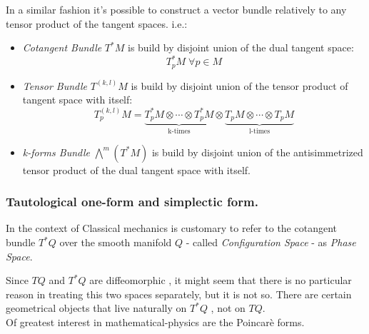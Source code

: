 \documentclass[Main]{subfiles}
\begin{document}
			\begin{observation}
				In a similar fashion it's possible to construct a vector bundle relatively to any tensor product of the tangent spaces.
				i.e.:
				\begin{itemize}
					\item \emph{Cotangent Bundle} $T^*M$ is build by disjoint union of the dual tangent space: 
					$$T_p^*M \; \forall p\in M$$
					\item \emph{Tensor Bundle} $T^{(k,l)}M$ is build by disjoint union of the tensor product of tangent space with itself:
					\begin{displaymath}
						T^{(k,l)}_ p M = \underbrace{T^*_pM \otimes \cdots \otimes T^*_pM}_{\textrm{k-times}} \otimes
						\underbrace{T_pM \otimes \cdots \otimes T_pM}_{\textrm{l-times}}
					\end{displaymath}
					\item \emph{k-forms Bundle} $ \bigwedge^m( T^*M)$ is build by disjoint union of the antisimmetrized tensor product of the dual tangent space with itself.
				\end{itemize}
			\end{observation}
			
			
			\subsubsection{Tautological one-form and simplectic form.}
					\begin{notationfix}
						In the context of Classical mechanics is customary to refer to the cotangent bundle $T^*Q$ over the smooth manifold  $Q $ - called \emph{Configuration Space}  - as \emph{Phase Space}.
					\end{notationfix}
					Since $TQ$ and $T^*Q$ are diffeomorphic , it might seem that there is no particular reason in treating this two spaces separately, but it is not so.
					There are certain geometrical objects that live naturally on $T^*Q$ , not on $TQ$.\\
					Of greatest interest in mathematical-physics are the Poincarè forms\cite{Fraenkel}.
	
\end{document}
